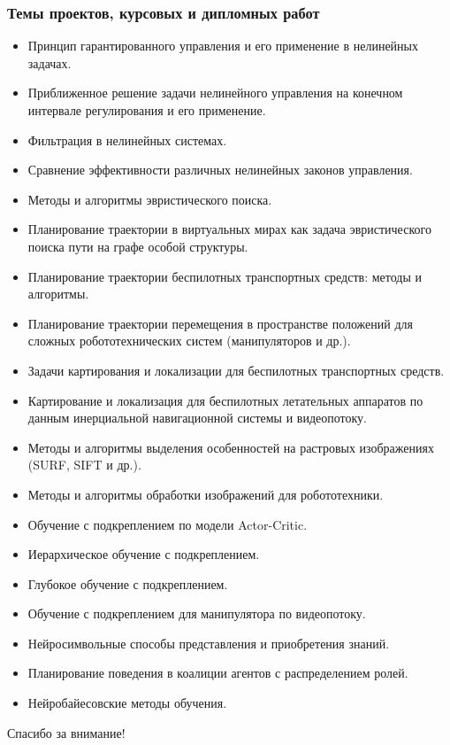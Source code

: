 \documentclass[12pt]{beamer}
\begin{document}
\begin{frame}
\frametitle{Темы проектов, курсовых и дипломных работ}
\tiny
\begin{itemize}
	\item Принцип гарантированного управления и его применение в нелинейных задачах.
	\item Приближенное решение задачи нелинейного управления на конечном интервале регулирования и его применение.
	\item Фильтрация в нелинейных системах.
	\item Сравнение эффективности различных нелинейных законов управления.
	
	\item Методы и алгоритмы эвристического поиска.
	\item Планирование траектории в виртуальных мирах как задача эвристического поиска пути на графе особой структуры.
	\item Планирование траектории беспилотных транспортных средств: методы и алгоритмы.
	\item Планирование траектории перемещения в пространстве положений для сложных робототехнических систем (манипуляторов и др.).
	\item Задачи картирования и локализации для беспилотных транспортных средств.
	\item Картирование и локализация для беспилотных летательных аппаратов по данным инерциальной навигационной системы и видеопотоку.
	\item Методы и алгоритмы выделения особенностей на растровых изображениях (SURF, SIFT  и др.).
	\item Методы и алгоритмы обработки изображений для робототехники.
	
	\item Обучение с подкреплением по модели Actor-Critic.
	\item Иерархическое обучение с подкреплением.
	\item Глубокое обучение с подкреплением.
	\item Обучение с подкреплением для манипулятора по видеопотоку.
	\item Нейросимвольные способы представления и приобретения знаний.
	\item Планирование поведения в коалиции агентов с распределением ролей.
	\item Нейробайесовские методы обучения.
	
\end{itemize}
\end{frame}

\begin{frame}

\centering
Спасибо за внимание!

\end{frame}
\end{document}
